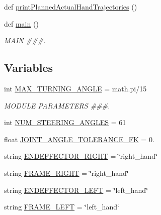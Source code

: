 \begin{DoxyCompactItemize}
\item 
def \mbox{\hyperlink{namespacesteering__trajectory__following__test_aad9b51b98a58a40eec88a0a39e6e38c9}{print\+Planned\+Actual\+Hand\+Trajectories}} ()
\item 
def \mbox{\hyperlink{namespacesteering__trajectory__following__test_a9100afcdf1effc9234df538db9e8a5af}{main}} ()
\begin{DoxyCompactList}\small\item\em M\+A\+IN \#\#\#. \end{DoxyCompactList}\end{DoxyCompactItemize}
\subsection*{Variables}
\begin{DoxyCompactItemize}
\item 
int \mbox{\hyperlink{namespacesteering__trajectory__following__test_a9bd926a4a846deabbe48eab3e7219a77}{M\+A\+X\+\_\+\+T\+U\+R\+N\+I\+N\+G\+\_\+\+A\+N\+G\+LE}} = math.\+pi/15
\begin{DoxyCompactList}\small\item\em M\+O\+D\+U\+LE P\+A\+R\+A\+M\+E\+T\+E\+RS \#\#\#. \end{DoxyCompactList}\item 
int \mbox{\hyperlink{namespacesteering__trajectory__following__test_a1eceaea757386a63dd208fe6c3407887}{N\+U\+M\+\_\+\+S\+T\+E\+E\+R\+I\+N\+G\+\_\+\+A\+N\+G\+L\+ES}} = 61
\item 
float \mbox{\hyperlink{namespacesteering__trajectory__following__test_af0d2a6ee09ffeae01a634a6d70413cd1}{J\+O\+I\+N\+T\+\_\+\+A\+N\+G\+L\+E\+\_\+\+T\+O\+L\+E\+R\+A\+N\+C\+E\+\_\+\+FK}} = 0.
\item 
string \mbox{\hyperlink{namespacesteering__trajectory__following__test_a015d0e3bf973472d055af475ec878099}{E\+N\+D\+E\+F\+F\+E\+C\+T\+O\+R\+\_\+\+R\+I\+G\+HT}} = \char`\"{}right\+\_\+hand\char`\"{}
\item 
string \mbox{\hyperlink{namespacesteering__trajectory__following__test_ad2b3d81f8b97a726200a2c467b173ea7}{F\+R\+A\+M\+E\+\_\+\+R\+I\+G\+HT}} = \char`\"{}right\+\_\+hand\char`\"{}
\item 
string \mbox{\hyperlink{namespacesteering__trajectory__following__test_a750ea60836d7697be3955b118c91925e}{E\+N\+D\+E\+F\+F\+E\+C\+T\+O\+R\+\_\+\+L\+E\+FT}} = \char`\"{}left\+\_\+hand\char`\"{}
\item 
string \mbox{\hyperlink{namespacesteering__trajectory__following__test_a1715eb3be2d0df23493b6618f822a20b}{F\+R\+A\+M\+E\+\_\+\+L\+E\+FT}} = \char`\"{}left\+\_\+hand\char`\"{}

\end{DoxyCompactItemize}
